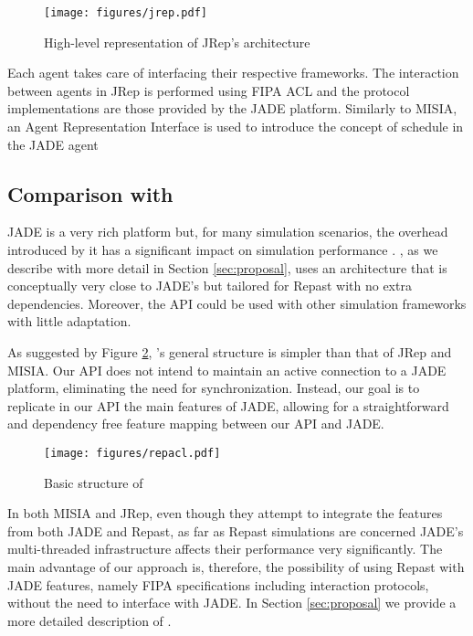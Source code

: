 \begin{figure}
	\centering
	\texttt{[image: figures/jrep.pdf]}
	\caption{High-level representation of JRep's architecture}
	\label{fig:jrep}
\end{figure}

Each agent takes care of interfacing their respective frameworks. The interaction between agents in JRep is performed using FIPA ACL and the protocol implementations are those provided by the JADE platform. Similarly to MISIA, an Agent Representation Interface is used to introduce the concept of schedule in the JADE agent


\subsection{Comparison with \apiname{}}

JADE is a very rich platform but, for many simulation scenarios, the overhead introduced by it has a significant impact on simulation performance \cite{mengistu2008scalability}. \apiname{}, as we describe with more detail in Section \ref{sec:proposal}, uses an architecture that is conceptually very close to JADE's but tailored for Repast with no extra dependencies. Moreover, the API could be used with other simulation frameworks with little adaptation.

As suggested by Figure \ref{fig:related-repacl}, \apiname{}'s general structure is simpler than that of JRep and MISIA. Our API does not intend to maintain an active connection to a JADE platform, eliminating the need for synchronization. Instead, our goal is to replicate in our API the main features of JADE, allowing for a straightforward and dependency free feature mapping between our API and JADE.

\begin{figure}
	\centering
	\texttt{[image: figures/repacl.pdf]}
	\caption{Basic structure of \apiname{}}
	\label{fig:related-repacl}
\end{figure}

In both MISIA and JRep, even though they attempt to integrate the features from both JADE and Repast, as far as Repast simulations are concerned JADE's multi-threaded infrastructure affects their performance very significantly. The main advantage of our approach is, therefore, the possibility of using Repast with JADE features, namely FIPA specifications including interaction protocols, without the need to interface with JADE. In Section \ref{sec:proposal} we provide a more detailed description of \apiname{}.

